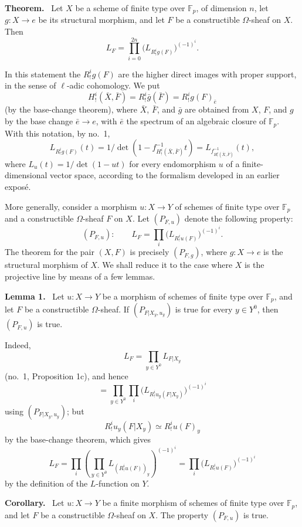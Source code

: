 \documentclass[11pt]{article}
\newenvironment{statement}[1]{\par\medskip\noindent\textbf{#1.}\ }{\par\medskip}
\begin{document}
\begin{statement}{Theorem}
Let $X$ be a scheme of finite type over $\mathbb F_p$, of dimension $n$, let $g:X\to e$ be its structural morphism, and let $F$ be a constructible $\Omega$-sheaf on $X$. Then
\[
L_F=\prod_{i=0}^{2n}\bigl(L_{R^i_!g(F)}\bigr)^{(-1)^i}.
\tag{1}
\]
\end{statement}

In this statement the $R^i_!g(F)$ are the higher direct images with proper support, in the sense of $\ell$-adic cohomology. We put
\[
H^i_!(\bar X,\bar F)=R^i_!\bar g(\bar F)=R^i_!g(F)_{\bar e}
\]
(by the base-change theorem), where $\bar X$, $\bar F$, and $\bar g$ are obtained from $X$, $F$, and $g$ by the base change $\bar e\to e$, with $\bar e$ the spectrum of an algebraic closure of $\mathbb F_p$. With this notation, by no.~1,
\[
L_{R^i_!g(F)}(t)=1/\det(1-f^{-1}_{H^i_!(\bar X,\bar F)}t)
 =L_{f^{-1}_{H^i_!(\bar X,\bar F)}}(t),
\]
where $L_u(t)=1/\det(1-ut)$ for every endomorphism $u$ of a finite-dimensional vector space, according to the formalism developed in an earlier exposé.

More generally, consider a morphism $u:X\to Y$ of schemes of finite type over $\mathbb F_p$ and a constructible $\Omega$-sheaf $F$ on $X$. Let $(P_{F,u})$ denote the following property:
\[
(P_{F,u}):\qquad
L_F=\prod_i\bigl(L_{R^i_!u(F)}\bigr)^{(-1)^i}.
\]
The theorem for the pair $(X,F)$ is precisely $(P_{F,g})$, where $g:X\to e$ is the structural morphism of $X$. We shall reduce it to the case where $X$ is the projective line by means of a few lemmas.

\begin{statement}{Lemma 1}
Let $u:X\to Y$ be a morphism of schemes of finite type over $\mathbb F_p$, and let $F$ be a constructible $\Omega$-sheaf. If $(P_{F|X_y,u_y})$ is true for every $y\in Y^0$, then $(P_{F,u})$ is true.
\end{statement}

Indeed,
\[
L_F=\prod_{y\in Y^0}L_{F|X_y}
\]
(no.~1, Proposition 1c), and hence
\[
=\prod_{y\in Y^0}\prod_i\bigl(L_{R^i_!u_y(F|X_y)}\bigr)^{(-1)^i}
\]
using $(P_{F|X_y,u_y})$; but
\[
R^i_!u_y(F|X_y)\simeq R^i_!u(F)_y
\]
by the base-change theorem, which gives
\[
L_F=\prod_i\left(\prod_{y\in Y^0}L_{(R^i_!u(F))_y}\right)^{(-1)^i}
=\prod_i\bigl(L_{R^i_!u(F)}\bigr)^{(-1)^i}
\]
by the definition of the $L$-function on $Y$.

\begin{statement}{Corollary}
Let $u:X\to Y$ be a finite morphism of schemes of finite type over $\mathbb F_p$, and let $F$ be a constructible $\Omega$-sheaf on $X$. The property $(P_{F,u})$ is true.
\end{statement}
\end{document}
